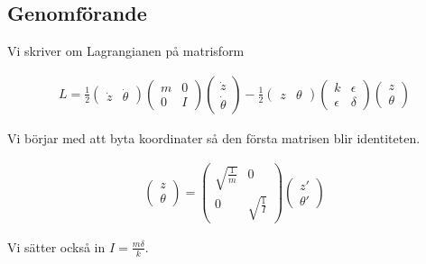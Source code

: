 \documentclass[a4paper]{article}
\begin{document}
\subsection{Genomförande}

Vi skriver om Lagrangianen på matrisform

\begin{align*}
    L = \frac{1}{2} \begin{pmatrix} \dot{z} & \dot{\theta} \end{pmatrix} \begin{pmatrix} m & 0 \\ 0 & I \end{pmatrix} \begin{pmatrix} \dot{z} \\ \dot{\theta} \end{pmatrix} - \frac{1}{2} \begin{pmatrix} z & \theta \end{pmatrix} \begin{pmatrix} k & \epsilon \\ \epsilon & \delta \end{pmatrix} \begin{pmatrix} z \\ \theta \end{pmatrix}
\end{align*}

Vi börjar med att byta koordinater så den första matrisen blir identiteten.

\begin{align*}
    \begin{pmatrix}
        z \\
        \theta
    \end{pmatrix} = \begin{pmatrix}
        \sqrt{\frac{1}{m}} & 0 \\ 0 & \sqrt{\frac{1}{I}}
    \end{pmatrix}
    \begin{pmatrix}
        z' \\
        \theta'
    \end{pmatrix}
\end{align*}

Vi sätter också in $I=\frac{m\delta}{k}$.
\end{document}

